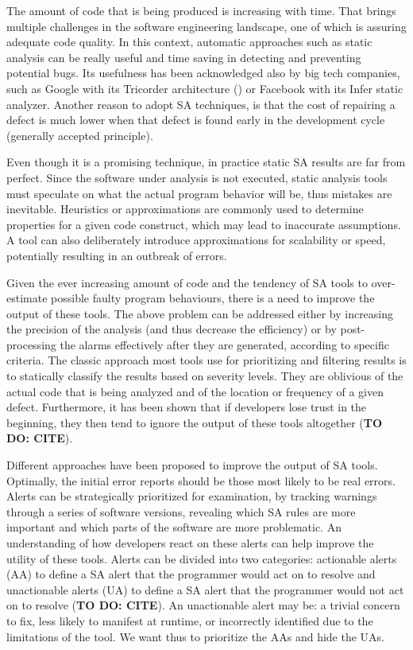 \documentclass{article}
\begin{document}
The amount of code that is being produced is increasing with time. That brings multiple challenges in the software engineering landscape, one of which is assuring adequate code quality. In this context, automatic approaches such as static analysis can be really useful and time saving in detecting and preventing potential bugs. Its usefulness has been acknowledged also by big tech companies, such as Google with its Tricorder architecture (\cite{sa_google}) or Facebook with its Infer static analyzer.
Another reason to adopt SA techniques, is that the cost of repairing a defect is much lower when that defect is found early in the development cycle (generally accepted principle).

Even though it is a promising technique, in practice static SA results are far from perfect. Since the software under analysis is not executed, static analysis tools must speculate on what the actual program behavior will be, thus mistakes are inevitable. Heuristics or approximations are commonly used to determine properties for a given code construct, which may lead to inaccurate assumptions. A tool can also deliberately introduce approximations for scalability or speed, potentially resulting in an outbreak of errors.

Given the ever increasing amount of code and the tendency of SA tools to over-estimate possible faulty program behaviours, there is a need to improve the output of these tools. The above problem can be addressed either by increasing the precision of the analysis (and thus decrease the efficiency) or by post-processing the alarms effectively after they are generated, according to specific criteria.
The classic approach most tools use for prioritizing and filtering results is to statically classify the results based on severity levels. They are oblivious of the actual code that is being analyzed and of the location or frequency of a given defect. Furthermore, it has been shown that if developers lose trust in the beginning, they then tend to ignore the output of these tools altogether (\textbf{TO DO: CITE}).

Different approaches have been proposed to improve the output of SA tools. Optimally, the initial error reports should be those most likely to be real errors. Alerts can be strategically prioritized for examination, by tracking warnings through a series of software versions, revealing which SA rules are more important and which parts of the software are more problematic. 
An understanding of how developers react on these alerts can help improve the utility of these tools. Alerts can be divided into two categories: actionable alerts (AA) to define a SA alert that the programmer would act on to resolve and unactionable alerts (UA) to define a SA alert that the programmer would not act on to resolve (\textbf{TO DO: CITE}). An unactionable alert may be: a trivial concern to fix, less likely to manifest at runtime, or incorrectly identified due to the limitations of the tool. We want thus to prioritize the AAs and hide the UAs.
\end{document}
